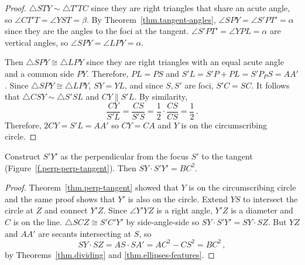 
\begin{proof}

$\triangle STY\sim\triangle T'TC$ since they are right triangles that share an acute angle, so $\angle CT'T=\angle YST=\beta$. By Theorem~\ref{thm.tangent-angles}, $\angle SPY=\angle S'PT'=\alpha$ since they are the angles to the foci at the tangent. $\angle S'PT'=\angle YPL=\alpha$ are vertical angles, so $\angle SPY=\angle LPY=\alpha$. 

Then $\triangle SPY\cong\triangle LPY$ since they are right triangles with an equal acute angle and a common side $PY$. Therefore, $PL=PS$ and $S'L=S'P+PL=S'P_PS=AA'$. Since $\triangle SPY\cong\triangle LPY$, $SY=YL$, and since $S,S'$ are foci, $S'C=SC$. It follows that $\triangle CSY\sim \triangle S'SL$ and $CY\parallel S'L$. By similarity,
\[
\frac{CY}{S'L}=\frac{CS}{S'S}=\frac{1}{2}\cdot\frac{CS}{CS}=\frac{1}{2}\,.
\]
Therefore, $2CY=S'L=AA'$ so $CY=CA$ and $Y$ is on the circumscribing circle.\hqed
\end{proof}


\begin{theorem}[Prop. XI]\label{thm.perp-perp-tangent}
Construct $S'Y'$ as the perpendicular from the focus $S'$ to the tangent (Figure~\ref{f.perp-perp-tangent}). Then $SY\cdot S'Y' = BC^2$.
\end{theorem}

\begin{proof}
Theorem~\ref{thm.perp-tangent} showed that $Y$ is on the circumscribing circle and the same proof shows that $Y'$ is also on the circle. Extend $YS$ to intersect the circle at $Z$ and connect $Y'Z$. Since $\angle Y'YZ$ is a right angle, $Y'Z$ is a diameter and $C$ is on the line. $\triangle SCZ \cong S'C'Y'$ by side-angle-side so $SY\cdot S'Y' = SY \cdot SZ$. But $YZ$ and $AA'$ are secants intersecting at $S$, so
\[
SY\cdot SZ = AS\cdot SA' = AC^2-CS^ 2 = BC^2\,,
\]
by Theorems~\ref{thm.dividing} and \ref{thm.ellipses-features}.\hqed
\end{proof}


